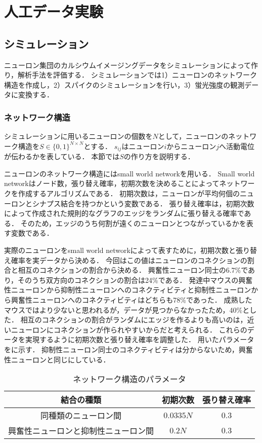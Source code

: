 \chapter{人工データ実験}
\section{シミュレーション}
ニューロン集団のカルシウムイメージングデータをシミュレーションによって作り，解析手法を評価する．
シミュレーションでは1）ニューロンのネットワーク構造を作成し，2）スパイクのシミュレーションを行い，3）蛍光強度の観測データに変換する．
\subsection{ネットワーク構造}
シミュレーションに用いるニューロンの個数を$N$として，ニューロンのネットワーク構造を$S \in \{0, 1\}^{N \times N}$とする．
$s_{ij}$はニューロン$i$からニューロン$j$へ活動電位が伝わるかを表している．
本節では$S$の作り方を説明する．

ニューロンのネットワーク構造にはsmall world network\cite{Watts1998}を用いる．
Small world networkはノード数，張り替え確率，初期次数を決めることによってネットワークを作成するアルゴリズムである．
初期次数は，ニューロンが平均何個のニューロンとシナプス結合を持つかという変数である．
張り替え確率は，初期次数によって作成された規則的なグラフのエッジをランダムに張り替える確率である．
そのため，エッジのうち何割が遠くのニューロンとつながっているかを表す変数である．

実際のニューロンをsmall world networkによって表すために，初期次数と張り替え確率を実データから決める．
今回はこの値はニューロンのコネクションの割合と相互のコネクションの割合から決める．
興奮性ニューロン同士の6.7\%であり，そのうち双方向のコネクションの割合は24\%である\cite{Jouhanneau2015}．
発達中マウスの興奮性ニューロンから抑制性ニューロンへのコネクティビティと抑制性ニューロンから興奮性ニューロンへのコネクティビティはどちらも78\%であった\cite{Holmgren2003}．
成熟したマウスではより少ないと思われるが，データが見つからなかったため，40\%とした．
相互のコネクションの割合がランダムにエッジを作るよりも高いのは，近いニューロンにコネクションが作られやすいからだと考えられる．
これらのデータを実現するように初期次数と張り替え確率を調整した．
用いたパラメータをに示す．
抑制性ニューロン同士のコネクティビティは分からないため，興奮性ニューロンと同じにしている．

\begin{table}[htb]
  \center
  \begin{tabular}{|c|cc|} \hline
    結合の種類 & 初期次数 & 張り替え確率 \\ \hline
		同種類のニューロン間 & $0.0335 N$ & $0.3$ \\
		興奮性ニューロンと抑制性ニューロン間 & $0.2N$ & $0.3$\\ \hline
  \end{tabular}
  \caption{ネットワーク構造のパラメータ}
  \label{tab:parameter1}
\end{table}

